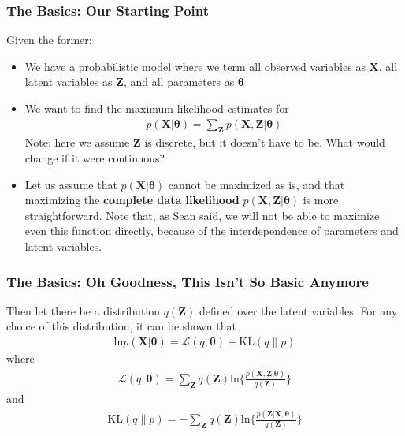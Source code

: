 \documentclass{beamer}
\begin{document}
\begin{frame}
\frametitle{The Basics: Our Starting Point}
Given the former:	
	\begin{itemize}
		\item We have a probabilistic model where we term all observed variables as $\mathbf{X}$, all latent variables as $\mathbf{Z}$, and all parameters as $\boldsymbol{\theta}$
		\item We want to find the maximum likelihood estimates for 
		\begin{align}
			p(\mathbf{X}|\boldsymbol{\theta}) = \sum_{\mathbf{Z}}p(\mathbf{X},\mathbf{Z}|\boldsymbol{\theta}) 
		\end{align}
		Note: here we assume $\mathbf{Z}$ is discrete, but it doesn't have to be. What would change if it were continuous?
		\item Let us assume that $	p(\mathbf{X}|\boldsymbol{\theta})$ cannot be maximized as is, and that maximizing the \textbf{complete data likelihood} $p(\mathbf{X},\mathbf{Z}|\boldsymbol{\theta})$ is more straightforward. Note that, as Sean said, we will not be able to maximize even this function directly, because of the interdependence of parameters and latent variables. 
	\end{itemize}
\end{frame}

\begin{frame}
\frametitle{The Basics: Oh Goodness, This Isn't So Basic Anymore}
Then let there be a distribution $q(\mathbf{Z})$ defined over the latent variables. For any choice of this distribution, it can be shown that
		\begin{align}
			\text{ln}p(\mathbf{X}|\boldsymbol{\theta}) =\mathcal{L}(q, \boldsymbol{\theta}) + \text{KL}(q\|p)
		\end{align}
where
		\begin{align}
			\mathcal{L}(q, \boldsymbol{\theta}) = \sum_{\mathbf{Z}}q(\mathbf{Z})\text{ln}\bigg\{\frac{p(\mathbf{X,  Z}|\boldsymbol{\theta})}{q(\mathbf{Z})}\bigg\} \label{eq:2}
		\end{align}
and
	\begin{align}
		\text{KL}(q\|p) = - \sum_{\mathbf{Z}}q(\mathbf{Z})\text{ln}\bigg\{\frac{p(\mathbf{Z|  X},\boldsymbol{\theta})}{q(\mathbf{Z})}\bigg\}
	\end{align}
\end{frame}
\end{document}
